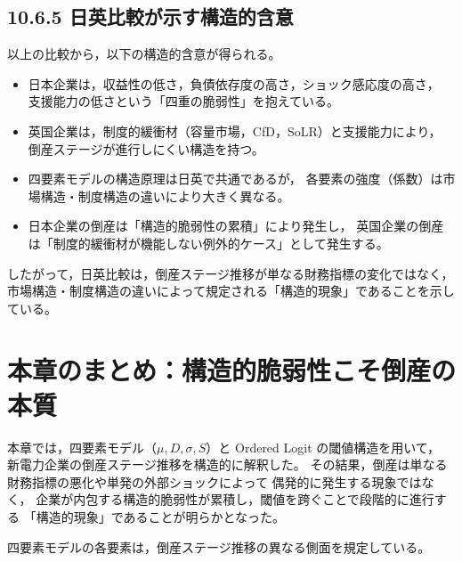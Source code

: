 \subsection*{10.6.5 日英比較が示す構造的含意}

以上の比較から，以下の構造的含意が得られる。

\begin{itemize}
    \item 日本企業は，収益性の低さ，負債依存度の高さ，ショック感応度の高さ，
          支援能力の低さという「四重の脆弱性」を抱えている。
    \item 英国企業は，制度的緩衝材（容量市場，CfD，SoLR）と支援能力により，
          倒産ステージが進行しにくい構造を持つ。
    \item 四要素モデルの構造原理は日英で共通であるが，
          各要素の強度（係数）は市場構造・制度構造の違いにより大きく異なる。
    \item 日本企業の倒産は「構造的脆弱性の累積」により発生し，
          英国企業の倒産は「制度的緩衝材が機能しない例外的ケース」として発生する。
\end{itemize}

したがって，日英比較は，倒産ステージ推移が単なる財務指標の変化ではなく，
市場構造・制度構造の違いによって規定される「構造的現象」であることを示している。


\section{本章のまとめ：構造的脆弱性こそ倒産の本質}

本章では，四要素モデル（$\mu, D, \sigma, S$）と Ordered Logit の閾値構造を用いて，
新電力企業の倒産ステージ推移を構造的に解釈した。
その結果，倒産は単なる財務指標の悪化や単発の外部ショックによって
偶発的に発生する現象ではなく，
企業が内包する構造的脆弱性が累積し，閾値を跨ぐことで段階的に進行する
「構造的現象」であることが明らかとなった。

四要素モデルの各要素は，倒産ステージ推移の異なる側面を規定している。

